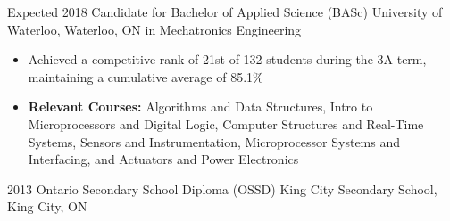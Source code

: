 \documentclass[hidelinks]{kkurucz-cv}
\begin{document}
\begin{entrylist}
\entry
{Expected 2018}
{Candidate for Bachelor of Applied Science (BASc)}
{University of Waterloo, Waterloo, ON}
{{\headingfont in Mechatronics Engineering}}
{
\begin{itemize}
\item Achieved a competitive rank of 21st of 132 students during the 3A term, maintaining a cumulative average of 85.1\%
\item \textbf{Relevant Courses:} Algorithms and Data Structures, Intro to Microprocessors and Digital Logic, Computer Structures and Real-Time Systems, Sensors and Instrumentation, Microprocessor Systems and Interfacing, and Actuators and Power Electronics
\end{itemize}
}
\entry
{2013}
{Ontario Secondary School Diploma (OSSD)}
{King City Secondary School, King City, ON}
{\null}
{\null}
\end{entrylist}
\end{document}
